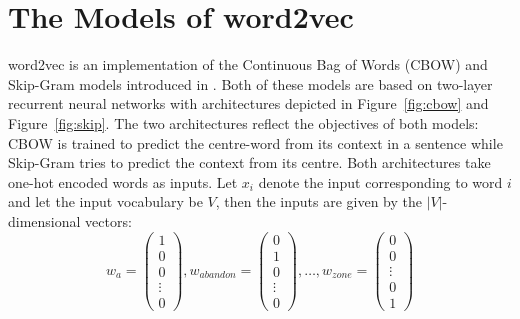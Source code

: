 \documentclass[conference]{IEEEtran}
\begin{document}
\section{The Models of word2vec}
\label{sec:model}

word2vec is an implementation of the Continuous Bag of Words (CBOW) and Skip-Gram
models introduced in \cite{mikolov2013efficient}. Both of these models are based
on  two-layer recurrent neural networks with architectures depicted in Figure~\ref{fig:cbow}
and Figure~\ref{fig:skip}. The two architectures reflect the objectives of both models: CBOW
is trained to predict the centre-word from its context in a sentence while Skip-Gram tries to predict
the context from its centre. Both architectures take one-hot encoded words as inputs. Let $x_i$
denote the input corresponding to word $i$ and let the input vocabulary be $V$, 
then the inputs are given by the $|V|$-dimensional vectors:
\begin{equation}
w_{a} = \begin{pmatrix}1 \\ 0 \\ 0 \\ \vdots \\ 0 \end{pmatrix},
w_{abandon} = \begin{pmatrix}0 \\ 1 \\ 0 \\ \vdots \\ 0 \end{pmatrix}, \dots ,
w_{zone} = \begin{pmatrix}0 \\ 0  \\ \vdots \\ 0 \\ 1 \end{pmatrix}
\end{equation}
\end{document}
